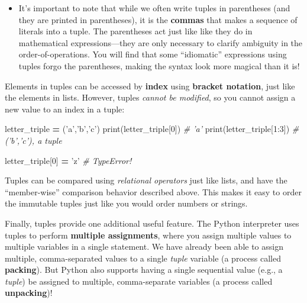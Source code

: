 \documentclass[]{book}
\newenvironment{Shaded}{\begin{snugshade}}{\end{snugshade}}
\newcommand{\DecValTok}[1]{\textcolor[rgb]{0.00,0.00,0.81}{#1}}
\newcommand{\StringTok}[1]{\textcolor[rgb]{0.31,0.60,0.02}{#1}}
\newcommand{\CommentTok}[1]{\textcolor[rgb]{0.56,0.35,0.01}{\textit{#1}}}
\newcommand{\OperatorTok}[1]{\textcolor[rgb]{0.81,0.36,0.00}{\textbf{#1}}}
\newcommand{\BuiltInTok}[1]{#1}
\newcommand{\NormalTok}[1]{#1}
\providecommand{\tightlist}{%
  \setlength{\itemsep}{0pt}\setlength{\parskip}{0pt}}
\begin{document}
\begin{itemize}
\tightlist
\item
  It's important to note that while we often write tuples in parentheses
  (and they are printed in parentheses), it is the \textbf{commas} that
  makes a sequence of literals into a tuple. The parentheses act just
  like like they do in mathematical expressions---they are only
  necessary to clarify ambiguity in the order-of-operations. You will
  find that some ``idiomatic'' expressions using tuples forgo the
  parentheses, making the syntax look more magical than it is!
\end{itemize}

Elements in tuples can be accessed by \textbf{index} using
\textbf{bracket notation}, just like the elements in lists. However,
tuples \emph{cannot be modified}, so you cannot assign a new value to an
index in a tuple:

\begin{Shaded}
\begin{Highlighting}[]
\NormalTok{letter_triple }\OperatorTok{=}\NormalTok{ (}\StringTok{'a'}\NormalTok{,}\StringTok{'b'}\NormalTok{,}\StringTok{'c'}\NormalTok{)}
\BuiltInTok{print}\NormalTok{(letter_triple[}\DecValTok{0}\NormalTok{])  }\CommentTok{# 'a'}
\BuiltInTok{print}\NormalTok{(letter_triple[}\DecValTok{1}\NormalTok{:}\DecValTok{3}\NormalTok{])  }\CommentTok{# ('b','c'), a tuple}

\NormalTok{letter_triple[}\DecValTok{0}\NormalTok{] }\OperatorTok{=} \StringTok{'z'}  \CommentTok{# TypeError!}
\end{Highlighting}
\end{Shaded}

Tuples can be compared using \emph{relational operators} just like
lists, and have the ``member-wise'' comparison behavior described above.
This makes it easy to order the immutable tuples just like you would
order numbers or strings.

Finally, tuples provide one additional useful feature. The Python
interpreter uses tuples to perform \textbf{multiple assignments}, where
you assign multiple values to multiple variables in a single statement.
We have already been able to assign multiple, comma-separated values to
a single \emph{tuple} variable (a process called \textbf{packing}). But
Python also supports having a single sequential value (e.g., a
\emph{tuple}) be assigned to multiple, comma-separate variables (a
process called \textbf{unpacking})!
\end{document}
